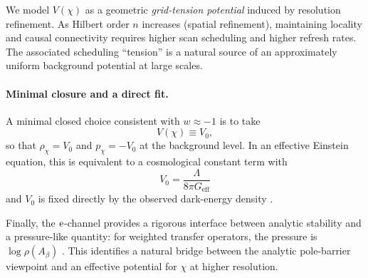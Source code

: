 We model $V(\chi)$ as a geometric \emph{grid-tension potential} induced by resolution refinement.
As Hilbert order $n$ increases (spatial refinement), maintaining locality and causal connectivity requires higher scan scheduling and higher refresh rates.
The associated scheduling ``tension'' is a natural source of an approximately uniform background potential at large scales.

\paragraph{Minimal closure and a direct fit.}
A minimal closed choice consistent with $w\approx -1$ is to take
\[
V(\chi)\equiv V_0,
\]
so that $\rho_\chi=V_0$ and $p_\chi=-V_0$ at the background level.
In an effective Einstein equation, this is equivalent to a cosmological constant term with
\[
V_0=\frac{\Lambda}{8\pi G_{\mathrm{eff}}}
\]
and $V_0$ is fixed directly by the observed dark-energy density \cite{Planck2018CosmoParams}.

Finally, the $\mathrm{e}$-channel provides a rigorous interface between analytic stability and a pressure-like quantity:
for weighted transfer operators, the pressure is $\log\rho(A_\beta)$ \cite{Ruelle1978}.
This identifies a natural bridge between the analytic pole-barrier viewpoint and an effective potential for $\chi$ at higher resolution.



